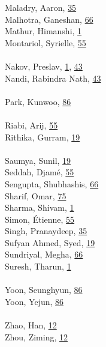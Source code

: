 \documentclass[11pt,oneside]{book}
\begin{document}
\begin{multicols}{2}
Maladry, Aaron, \hyperlink{page.35}{35}\\
Malhotra, Ganeshan, \hyperlink{page.66}{66}\\
Mathur, Himanshi, \hyperlink{page.1}{1}\\
Montariol, Syrielle, \hyperlink{page.55}{55}\\
\\ %
Nakov, Preslav, \hyperlink{page.1}{1}, \hyperlink{page.43}{43}\\
Nandi, Rabindra Nath, \hyperlink{page.43}{43}\\
\\ %
Park, Kunwoo, \hyperlink{page.86}{86}\\
\\ %
Riabi, Arij, \hyperlink{page.55}{55}\\
Rithika, Gurram, \hyperlink{page.19}{19}\\
\\ %
Saumya, Sunil, \hyperlink{page.19}{19}\\
Seddah, Djamé, \hyperlink{page.55}{55}\\
Sengupta, Shubhashis, \hyperlink{page.66}{66}\\
Sharif, Omar, \hyperlink{page.75}{75}\\
Sharma, Shivam, \hyperlink{page.1}{1}\\
Simon, Étienne, \hyperlink{page.55}{55}\\
Singh, Pranaydeep, \hyperlink{page.35}{35}\\
Sufyan Ahmed, Syed, \hyperlink{page.19}{19}\\
Sundriyal, Megha, \hyperlink{page.66}{66}\\
Suresh, Tharun, \hyperlink{page.1}{1}\\
\\ %
Yoon, Seunghyun, \hyperlink{page.86}{86}\\
Yoon, Yejun, \hyperlink{page.86}{86}\\
\\ %
Zhao, Han, \hyperlink{page.12}{12}\\
Zhou, Ziming, \hyperlink{page.12}{12}\\
\\ %
\end{multicols}
\end{document}
